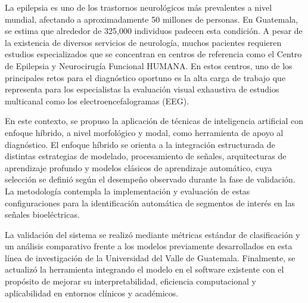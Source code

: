 La epilepsia es uno de los trastornos neurológicos más prevalentes a nivel mundial, afectando a aproximadamente 50 millones de personas. En Guatemala, se estima que alrededor de 325,000 individuos padecen esta condición. A pesar de la existencia de diversos servicios de neurología, muchos pacientes requieren estudios especializados que se concentran en centros de referencia como el Centro de Epilepsia y Neurocirugía Funcional HUMANA. En estos centros, uno de los principales retos para el diagnóstico oportuno es la alta carga de trabajo que representa para los especialistas la evaluación visual exhaustiva de estudios multicanal como los electroencefalogramas (EEG). 

En este contexto, se propuso la aplicación de técnicas de inteligencia artificial con enfoque híbrido, a nivel morfológico y modal, como herramienta de apoyo al diagnóstico. El enfoque híbrido se orienta a la integración estructurada de distintas estrategias de modelado, procesamiento de señales, arquitecturas de aprendizaje profundo y modelos clásicos de aprendizaje automático, cuya selección se definió según el desempeño observado durante la fase de validación. La metodología contempla la implementación y evaluación de estas configuraciones para la identificación automática de segmentos de interés en las señales bioeléctricas.

La validación del sistema se realizó mediante métricas estándar de clasificación y un análisis comparativo frente a los modelos previamente desarrollados en esta línea de investigación de la Universidad del Valle de Guatemala. Finalmente, se actualizó la herramienta integrando el modelo en el software existente con el propósito de mejorar su interpretabilidad, eficiencia computacional y aplicabilidad en entornos clínicos y académicos.